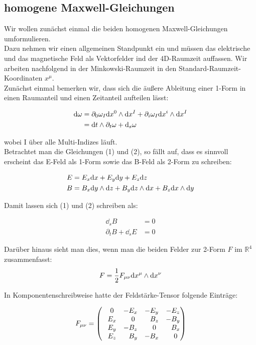 \subsection{homogene Maxwell-Gleichungen}
Wir wollen zunächst einmal die beiden homogenen Maxwell-Gleichungen umformulieren. \\
Dazu nehmen wir einen allgemeinen Standpunkt ein und müssen das elektrische und das magnetische Feld als Vektorfelder ind der 4D-Raumzeit auffassen. Wir arbeiten nachfolgend in der Minkowski-Raumzeit in den Standard-Raumzeit-Koordinaten $x^{\mu}$. \\
Zunächst einmal bemerken wir, dass sich die äußere Ableitung einer 1-Form in einen Raumanteil und einen Zeitanteil aufteilen lässt:

\begin{align}
\dd \omega &= \partial_0 \omega_I \dd x^0 \wedge \dd x^{I} + \partial_i \omega_I \dd x^i \wedge \dd x^{I} \\
&= \dd t \wedge \partial_t \omega + \dd_s \omega 
\end{align}

wobei I über alle Multi-Indizes läuft. \\
Betrachtet man die Gleichungen (1) und (2), so fällt auf, dass es sinnvoll erscheint das E-Feld als 1-Form sowie das B-Feld als 2-Form zu schreiben:

\begin{align}
E &= E_x \dd x +E_y \dd y + E_z \dd z   \\
B &= B_x \dd y \wedge \dd z + B_y \dd z \wedge \dd x + B_z \dd x \wedge \dd y 
\end{align}

Damit lassen sich (1) und (2) schreiben als:

\begin{align}
\dd_s B &= 0 \\
\partial_t B + \dd_s E &=0
\end{align}

Darüber hinaus sieht man dies, wenn man die beiden Felder zur 2-Form $F$ im $\mathbb{R}^4$ zusammenfasst:
\begin{align}
F = \frac{1}{2} F_{\mu \nu} \dd x^{\mu} \wedge \dd x^{\nu}
\end{align}

In Komponentenschreibweise hatte der Feldstärke-Tensor folgende Einträge:

\begin{align}
F_{\mu \nu} =
\begin{pmatrix}
\phantom{-}0 & -E_x & -E_y & -E_z \\
\phantom{-}E_x & \phantom{-}0 & \phantom{-}B_z & -B_y \\
\phantom{-}E_y & -B_z & \phantom{-}0 & \phantom{-}B_x \\
\phantom{-}E_z & \phantom{-}B_y & -B_x & \phantom{-}0
\end{pmatrix}
\end{align}


